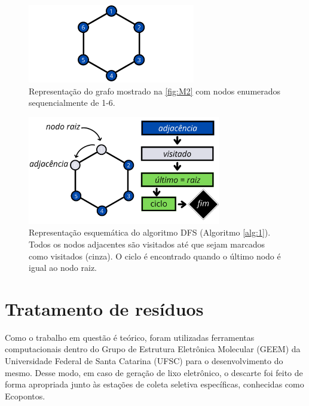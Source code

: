 \begin{figure}[htb]
\caption{\label{fig:graphEnumerated}Representação do grafo mostrado na \autoref{fig:M2} com nodos enumerados sequencialmente de 1-6.}
	\begin{center}
		\includegraphics[width=0.65\textwidth]{images/graphEnumerated.png}
	\end{center}
\end{figure}

\begin{figure}[htb]
\caption{\label{fig:DFS} Representação esquemática do algoritmo DFS (Algoritmo \ref{alg:1}). Todos os nodos adjacentes são visitados até que sejam marcados como visitados (cinza). O ciclo é encontrado quando o último nodo é igual ao nodo raiz.}
	\begin{center}
		\includegraphics[width=0.75\textwidth]{images/DFS.png}
	\end{center}
\end{figure}

\section{Tratamento de resíduos}

Como o trabalho em questão é teórico, foram utilizadas ferramentas computacionais dentro do Grupo de Estrutura Eletrônica Molecular (GEEM) da Universidade Federal de Santa Catarina (UFSC) para o desenvolvimento do mesmo. Desse modo, em caso de geração de lixo eletrônico, o descarte foi feito de forma apropriada junto às estações de coleta seletiva específicas, conhecidas como Ecopontos.